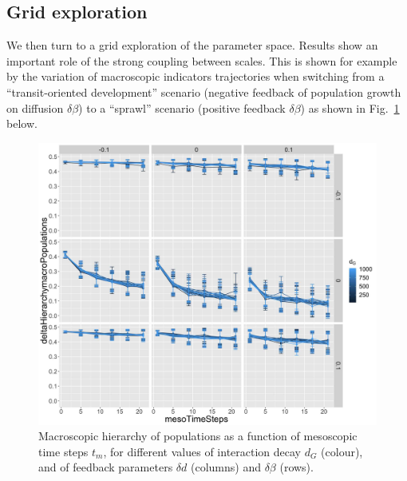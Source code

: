 \documentclass[referee,lineno,pdflatex,sn-apa]{sn-jnl}
\begin{document}
\subsection{Grid exploration}





We then turn to a grid exploration of the parameter space. Results show an important role of the strong coupling between scales. This is shown for example by the variation of macroscopic indicators trajectories when switching from a ``transit-oriented development'' scenario (negative feedback of population growth on diffusion $\delta \beta$) to a ``sprawl'' scenario (positive feedback $\delta \beta$) as shown in Fig.~\ref{fig:fig3} below.

\begin{figure}[H]
	\includegraphics[width=\linewidth]{figures/Fig3.jpg}
	\caption{Macroscopic hierarchy of populations as a function of mesoscopic time steps $t_m$, for different values of interaction decay $d_G$ (colour), and of feedback parameters $\delta d$ (columns) and $\delta \beta$ (rows).\label{fig:fig3}}
\end{figure}
\end{document}

